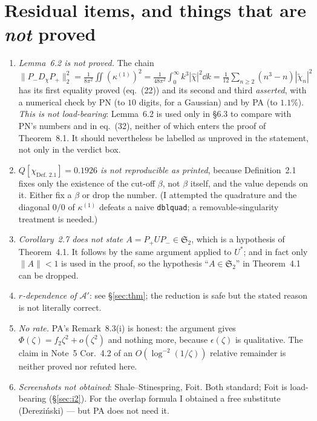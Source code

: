 \documentclass[11pt]{article}
\newcommand{\Pp}{P_+}\newcommand{\Pm}{P_-}
\providecommand{\Stwo}{\mathfrak S_2}\providecommand{\Sone}{\mathfrak S_1}
\providecommand{\norm}[1]{\lVert #1\rVert}\providecommand{\abs}[1]{\lvert #1\rvert}
\begin{document}
\section{Residual items, and things that are \emph{not} proved}\label{sec:residual}
\begin{enumerate}[label=(R\arabic*),leftmargin=3em]
\item \emph{Lemma~6.2 is not proved.}  The chain
 $\norm{\Pm D_\chi\Pp}_2^2=\frac1{8\pi^2}\iint(\kappa^{(1)})^2
 =\frac1{48\pi^2}\int_0^\infty k^3|\hat\chi|^2\dd k=\frac1{12}\sum_{n\ge2}(n^3-n)|\widetilde\chi_n|^2$
 has its first equality proved (eq.~(22)) and its second and third \emph{asserted}, with a
 numerical check by PN (to $10$ digits, for a Gaussian) and by PA (to $1.1\%$).  \emph{This is not
 load-bearing}: Lemma~6.2 is used only in \S6.3 to compare with PN's numbers and in eq.~(32),
 neither of which enters the proof of Theorem~8.1.  It should nevertheless be labelled as
 unproved in the statement, not only in the verdict box.
\item \emph{$Q[\chi_{\text{Def.~2.1}}]=0.1926$ is not reproducible as printed}, because
 Definition~2.1 fixes only the existence of the cut-off $\beta$, not $\beta$ itself, and the value
 depends on it.  Either fix a $\beta$ or drop the number.  (I attempted the quadrature and the
 diagonal $0/0$ of $\kappa^{(1)}$ defeats a naive \texttt{dblquad}; a removable-singularity
 treatment is needed.)
\item \emph{Corollary~2.7 does not state $A=\Pp U\Pm\in\Stwo$}, which is a hypothesis of
 Theorem~4.1.  It follows by the same argument applied to $U^*$; and in fact only $\norm A<1$ is
 used in the proof, so the hypothesis ``$A\in\Stwo$'' in Theorem~4.1 can be dropped.
\item \emph{$r$-dependence of $\mathcal A'$}: see \S\ref{sec:thm}; the reduction is safe but the
 stated reason is not literally correct.
\item \emph{No rate.}  PA's Remark~8.3(i) is honest: the argument gives
 $\Phi(\zeta)=f_2\zeta^2+o(\zeta^2)$ and nothing more, because $\epsilon(\zeta)$ is qualitative.
 The claim in Note~5 Cor.~4.2 of an $O(\log^{-2}(1/\zeta))$ relative remainder is neither proved nor
 refuted here.
\item \emph{Screenshots not obtained}: Shale--Stinespring, Foit.  Both standard; Foit is
 load-bearing (\S\ref{sec:i2}).  For the overlap formula I obtained a free substitute
 (Derezi\'nski) --- but PA does not need it.
\end{enumerate}
\end{document}
